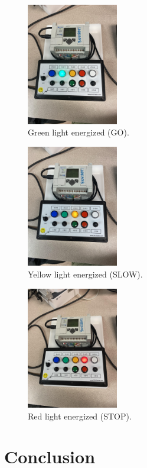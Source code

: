 \documentclass{article}
\begin{document}
\begin{figure}[!ht] 
    \centering
    \includegraphics[width = 4cm]{green.jpg}
    \caption{Green light energized (GO).}
    \label{fig:green}
\end{figure}

\begin{figure}[!ht] 
    \centering
    \includegraphics[width = 4cm]{yellow.jpg}
    \caption{Yellow light energized (SLOW).}
    \label{fig:yellow}
\end{figure}

\begin{figure}[!ht] 
    \centering
    \includegraphics[width = 4cm]{red.jpg}
    \caption{Red light energized (STOP).}
    \label{fig:red}
\end{figure}

\section{Conclusion}
\end{document}
